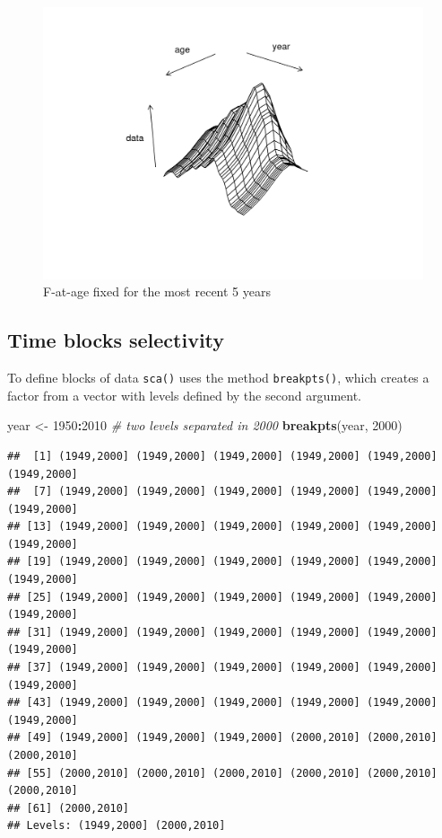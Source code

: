 \documentclass[
]{book}
\newenvironment{Shaded}{\begin{snugshade}}{\end{snugshade}}
\newcommand{\CommentTok}[1]{\textcolor[rgb]{0.56,0.35,0.01}{\textit{#1}}}
\newcommand{\DecValTok}[1]{\textcolor[rgb]{0.00,0.00,0.81}{#1}}
\newcommand{\FunctionTok}[1]{\textcolor[rgb]{0.13,0.29,0.53}{\textbf{#1}}}
\newcommand{\NormalTok}[1]{#1}
\newcommand{\OtherTok}[1]{\textcolor[rgb]{0.56,0.35,0.01}{#1}}
\newcommand{\SpecialCharTok}[1]{\textcolor[rgb]{0.81,0.36,0.00}{\textbf{#1}}}
\begin{document}
\begin{figure}
\centering
\includegraphics{_bookdown_files/_main_files/figure-html/ctsselyear-1.png}
\caption{\label{fig:ctsselyear}F-at-age fixed for the most recent 5 years}
\end{figure}

\hypertarget{time-blocks-selectivity}{%
\subsection{Time blocks selectivity}\label{time-blocks-selectivity}}

To define blocks of data \texttt{sca()} uses the method \texttt{breakpts()}, which creates a factor from a vector with levels defined by the second argument.

\begin{Shaded}
\begin{Highlighting}[]
\NormalTok{year }\OtherTok{\textless{}{-}} \DecValTok{1950}\SpecialCharTok{:}\DecValTok{2010}
\CommentTok{\# two levels separated in 2000}
\FunctionTok{breakpts}\NormalTok{(year, }\DecValTok{2000}\NormalTok{)}
\end{Highlighting}
\end{Shaded}

\begin{verbatim}
##  [1] (1949,2000] (1949,2000] (1949,2000] (1949,2000] (1949,2000] (1949,2000]
##  [7] (1949,2000] (1949,2000] (1949,2000] (1949,2000] (1949,2000] (1949,2000]
## [13] (1949,2000] (1949,2000] (1949,2000] (1949,2000] (1949,2000] (1949,2000]
## [19] (1949,2000] (1949,2000] (1949,2000] (1949,2000] (1949,2000] (1949,2000]
## [25] (1949,2000] (1949,2000] (1949,2000] (1949,2000] (1949,2000] (1949,2000]
## [31] (1949,2000] (1949,2000] (1949,2000] (1949,2000] (1949,2000] (1949,2000]
## [37] (1949,2000] (1949,2000] (1949,2000] (1949,2000] (1949,2000] (1949,2000]
## [43] (1949,2000] (1949,2000] (1949,2000] (1949,2000] (1949,2000] (1949,2000]
## [49] (1949,2000] (1949,2000] (1949,2000] (2000,2010] (2000,2010] (2000,2010]
## [55] (2000,2010] (2000,2010] (2000,2010] (2000,2010] (2000,2010] (2000,2010]
## [61] (2000,2010]
## Levels: (1949,2000] (2000,2010]
\end{verbatim}
\end{document}
